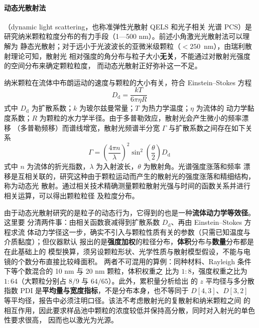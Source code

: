 \paragraph{动态光散射法}（dynamic light scattering，也称准弹性光散射 QELS 和光子相关
光谱 PCS）是研究纳米颗粒粒度分布的有力手段（1—500 nm）。前述小角激光光散射法可以理解为
静态光散射；对于远小于光波波长的亚微米级颗粒（$<250$~nm），由瑞利散射理论可知，散射光
相对强度的角分布与粒子大小\textbf{无关}，不能通过对散射光强度的空间分布来确定颗粒粒度，
而动态光散射正好弥补这一不足。

纳米颗粒在流体中布朗运动的速度与颗粒的大小有关，符合 Einstein--Stokes 方程
\begin{equation}\label{eq:ch01c-einstein}
D_{\mathrm{d}}=\frac{kT}{6\pi\eta R}
\end{equation}
式中 $D_{\mathrm{d}}$ 为扩散系数；$k$ 为玻尔兹曼常量；$T$ 为热力学温度；$\eta$ 为流体的
动力学黏度系数；$R$ 为颗粒的水力学半径。由于多普勒效应，散射光会产生微小的频率漂移
（多普勒频移）而谱线增宽，散射光频谱半分宽 $\Gamma$ 与扩散系数之间存在如下关系
\begin{equation}\label{eq:ch01c-doppler}
\Gamma=\left(\frac{4\pi n}{\lambda}\right)^{2}\sin^{2}\left(\frac{\theta}{2}\right)D_{\mathrm{d}}
\end{equation}
式中 $n$ 为流体的折光指数，$\lambda$ 为入射波长，$\theta$ 为散射角。光谱强度涨落和频率
漂移是互相关联的，研究这种由于颗粒运动而产生的散射光的强度涨落和精细结构，称为动态光
散射。通过相关技术精确测量颗粒散射光强与时间的函数关系并进行相关运算，可以得出颗粒粒径
及粒度分布。

由于动态光散射研究的是粒子的动态行为，它得到的也是一种\textbf{流体动力学等效径}。这里要
分清两件事：由相关函数衰减得到扩散系数 $D_{\mathrm{d}}$、再由 Einstein--Stokes 方程求流
体动力学径这一步，确实不引入与颗粒性质有关的参数（只需已知温度与介质黏度）；但仪器默认
报出的是\textbf{强度加权}的粒径分布，\textbf{体积}分布与\textbf{数量}分布都是在此基础上的
模型换算，须另设颗粒形状、光学性质与散射模型假设，不能与电镜的个数分布直接比较峰面积。
两者不可混用的算例：同种材料、Rayleigh 条件下等个数混合的 10 nm 与 20 nm 颗粒，体积权重之
比为 $1:8$，强度权重之比为 $1:64$（大颗粒分别占 $8/9$ 与 $64/65$）。此外，累积量分析给出
的 $z$ 平均径与多分散指数 PDI 是\textbf{平均量与宽度指标}，不是分布本身，也不等同于
$D[4,3]$、$D[3,2]$ 等平均径，报告中必须注明口径。该法不考虑散射光的复散射和纳米颗粒之间
的相互作用，因此要求样品池中颗粒的浓度较低并保持高分散，同时对入射光的单色性要求很高，
因而也以激光为光源。

